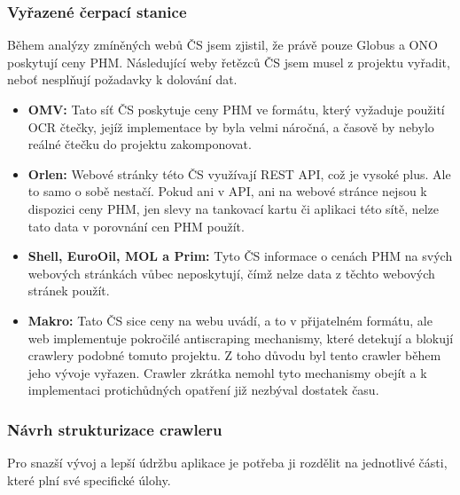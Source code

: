 \subsubsection{Vyřazené čerpací stanice}
\label{sec:preps-removed-stations}

Během analýzy zmíněných webů ČS jsem zjistil, že právě pouze Globus
a ONO poskytují ceny PHM. Následující weby řetězců ČS jsem musel
z projektu vyřadit, neboť nesplňují požadavky k dolování dat.

\begin{itemize}
    \item \textbf{OMV:} Tato síť ČS poskytuje ceny PHM ve formátu,
        který vyžaduje použití OCR čtečky, jejíž implementace
        by byla velmi náročná, a časově by nebylo reálné čtečku
        do projektu zakomponovat.
    \item \textbf{Orlen:} Webové stránky této ČS využívají REST API,
        což je vysoké plus. Ale to samo o sobě nestačí. Pokud ani
        v API, ani na webové stránce nejsou k dispozici ceny PHM,
        jen slevy na tankovací kartu či aplikaci této sítě, nelze
        tato data v porovnání cen PHM použít.
    \item \textbf{Shell, EuroOil, MOL a Prim:} Tyto ČS informace
        o cenách PHM na svých webových stránkách vůbec neposkytují,
        čímž nelze data z těchto webových stránek použít.
    \item \textbf{Makro:} Tato ČS sice ceny na webu uvádí, a to
        v přijatelném formátu, ale web implementuje pokročilé
        antiscraping mechanismy, které detekují a blokují crawlery
        podobné tomuto projektu. Z toho důvodu byl tento crawler
        během jeho vývoje vyřazen. Crawler zkrátka nemohl tyto
        mechanismy obejít a k implementaci protichůdných opatření
        již nezbýval dostatek času.
\end{itemize}

\subsubsection{Návrh strukturizace crawleru}
\label{sec:preps-crawler-structure}

Pro snazší vývoj a lepší údržbu aplikace je potřeba ji rozdělit na jednotlivé
části, které plní své specifické úlohy.

